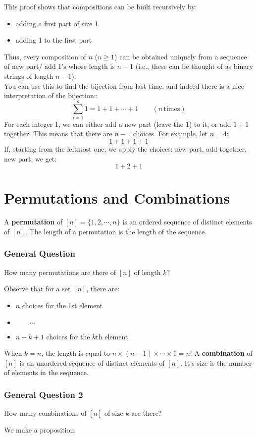 \documentclass{report}
\begin{document}
This proof shows that compositions can be built recursively by:
\begin{itemize}
\item adding a first part of size 1
\item adding 1 to the first part
\end{itemize}
Thus, every composition of $n$ ($n \geq 1$) can be obtained uniquely from a sequence of new part/ add 1's whose length is $n-1$ (i.e., these can be thought of as binary strings of length $n-1$).\\
You can use this to find the bijection from last time, and indeed there is a nice interpretation of the bijection::
$$\sum_{i=1}^n 1 = 1 + 1 + \cdots + 1 \qquad (n \, \text{times})$$
For each integer 1, we can either add a new part (leave the 1) to it, or add $1+1$ together. This means that there are $n-1$ choices. For example, let $n=4$:
$$1+1+1+1$$
If, starting from the leftmost one, we apply the choices: new part, add together, new part, we get:
$$1+2+1$$
\section{Permutations and Combinations}
A \textbf{permutation} of $[n] = \{1, 2, \cdots, n\}$ is an ordered sequence of distinct elements of $[n]$. The length of a permutation is the length of the sequence.
\subsubsection{General Question}
\begin{center}
How many permutations are there of $[n]$ of length $k$?
\end{center}
Observe that for a set $[n]$, there are:
\begin{itemize}
\item $n$ choices for the 1st element
\item $\qquad \cdots\qquad$
\item $n-k+1$ choices for the $k$th element
\end{itemize}
When $k = n$, the length is equal to $n \times (n-1) \times \cdots \times 1 = n!$
A \textbf{combination} of $[n]$ is an unordered sequence of distinct elements of $[n]$. It's size is the number of elements in the sequence.
\subsubsection{General Question 2}
\begin{center}
How many combinations of $[n]$ of size $k$ are there?
\end{center}
We make a proposition:
\end{document}
